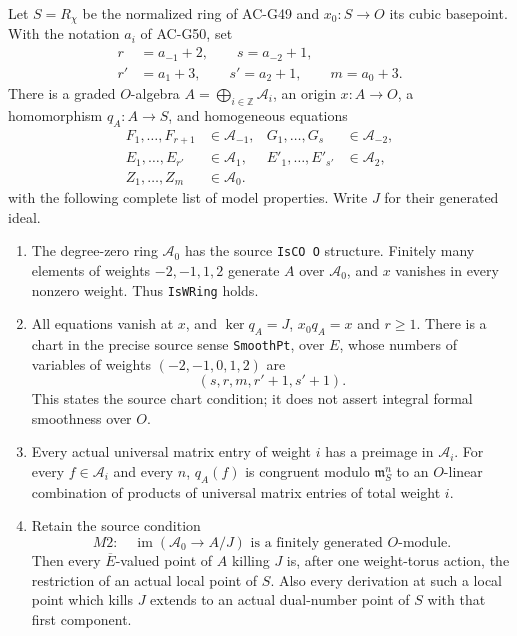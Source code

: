 \begin{theorem}
\label{AC-G51}
Let $S=R_\chi$ be the normalized ring of AC-G49 and
$x_0:S\to O$ its cubic basepoint.  With the notation
$a_i$ of AC-G50, set
\[
 \begin{split}
 r&=a_{-1}+2,\qquad s=a_{-2}+1,\\
 r'&=a_1+3,\qquad s'=a_2+1,\qquad m=a_0+3 .
 \end{split}                                                   \tag{G51.3}
\]
There is a graded $O$-algebra
$A=\bigoplus_{i\in\mathbb Z}\mathcal A_i$, an origin
$x:A\to O$, a homomorphism $q_A:A\to S$, and homogeneous
equations
\[
 \begin{aligned}
 F_1,\ldots,F_{r+1}&\in\mathcal A_{-1},&
 G_1,\ldots,G_s&\in\mathcal A_{-2},\\
 E_1,\ldots,E_{r'}&\in\mathcal A_1,&
 E'_1,\ldots,E'_{s'}&\in\mathcal A_2,\\
 Z_1,\ldots,Z_m&\in\mathcal A_0 .
 \end{aligned}                                                \tag{G51.4}
\]
with the following complete list of model properties.
Write $J$ for their generated ideal.

\begin{enumerate}
\item The degree-zero ring $\mathcal A_0$ has the source
\texttt{IsCO O} structure.  Finitely many elements of
weights $-2,-1,1,2$ generate $A$ over $\mathcal A_0$,
and $x$ vanishes in every nonzero weight.  Thus
\texttt{IsWRing} holds.

\item All equations vanish at $x$, and
$\ker q_A=J$, $x_0q_A=x$ and $r\ge1$.
There is a chart in the precise source sense
\texttt{SmoothPt}, over $E$, whose numbers of variables
of weights $(-2,-1,0,1,2)$ are
\[
                         (s,r,m,r'+1,s'+1).                   \tag{G51.5}
\]
This states the source chart condition; it does not
assert integral formal smoothness over $O$.

\item Every actual universal matrix entry of weight $i$
has a preimage in $\mathcal A_i$.  For every
$f\in\mathcal A_i$ and every $n$, $q_A(f)$ is congruent
modulo $\mathfrak m_S^n$ to an $O$-linear combination of
products of universal matrix entries of total weight $i$.

\item Retain the source condition
\[
 M2:\quad \operatorname{im}(\mathcal A_0\longrightarrow A/J)
                 \text{ is a finitely generated }O\text{-module}.
                                                               \tag{G51.6}
\]
Then every $\overline E$-valued point of $A$ killing $J$
is, after one weight-torus action, the restriction of an
actual local point of $S$.  Also every derivation at such
a local point which kills $J$ extends to an actual
dual-number point of $S$ with that first component.


\end{enumerate}
\end{theorem}
